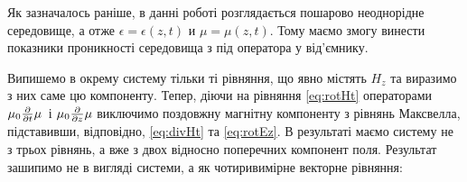 Як зазначалось раніше, в данні роботі розглядається пошарово неоднорідне 
середовище, а отже $ \epsilon = \epsilon(z,t) $ и $ \mu = \mu(z,t) $. Тому
маємо змогу винести показники проникності середовища з під оператора у 
від'ємнику.

Випишемо в окрему систему тільки ті рівняння, що явно містять $ H_z $ та 
виразимо з них саме цю компоненту. Тепер, діючи на рівняння \eqref{eq:rotHt} 
операторами $ \mu_0 \frac{\partial }{\partial t} \mu $ і $ \mu_0 \frac{\partial }{\partial z} \mu $ 
виключимо поздовжну магнітну компоненту з рівнянь Максвелла, підставивши, 
відповідно, \eqref{eq:divHt} та \eqref{eq:rotEz}. В результаті маємо систему 
не з трьох рівнянь, а вже з двох відносно поперечних компонент поля. 
Результат зашипимо не в вигляді системи, а як чотиривимірне векторне рівняння:

%
%
